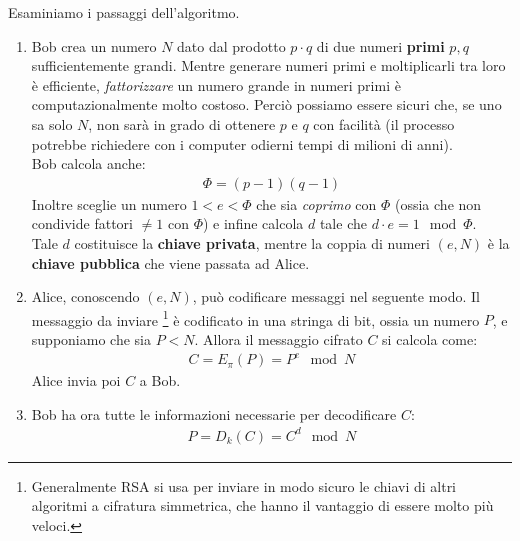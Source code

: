 \documentclass[../../InformazioneQuantistica.tex]{subfiles}
\begin{document}
Esaminiamo i passaggi dell'algoritmo.
\begin{enumerate}
\item Bob crea un numero $N$ dato dal prodotto $p\cdot q$ di due numeri \textbf{primi} $p,q$ sufficientemente grandi. Mentre generare numeri primi e moltiplicarli tra loro è efficiente, \textit{fattorizzare} un numero grande in numeri primi è computazionalmente molto costoso. Perciò possiamo essere sicuri che, se uno sa solo $N$, non sarà in grado di ottenere $p$ e $q$ con facilità (il processo potrebbe richiedere con i computer odierni tempi di milioni di anni).\\
Bob calcola anche:
\begin{align*}
\Phi = (p-1)(q-1)
\end{align*}
Inoltre sceglie un numero $1<e<\Phi$ che sia \textit{coprimo} con $\Phi$ (ossia che non condivide fattori $\neq 1$ con $\Phi$) e infine calcola $d$ tale che $d\cdot e = 1 \mod \Phi$.\\
Tale $d$ costituisce la \textbf{chiave privata}, mentre la coppia di numeri $(e,N)$ è la \textbf{chiave pubblica} che viene passata ad Alice.
\item Alice, conoscendo $(e,N)$, può codificare messaggi nel seguente modo. Il messaggio da inviare \footnote{Generalmente RSA si usa per inviare in modo sicuro le chiavi di altri algoritmi a cifratura simmetrica, che hanno il vantaggio di essere molto più veloci.} è codificato in una stringa di bit, ossia un numero $P$, e supponiamo che sia $P< N$. Allora il messaggio cifrato $C$ si calcola come:
\begin{align}
C = E_\pi (P) = P^e \mod N \label{eqn:crittoRSA}
\end{align}
Alice invia poi $C$ a Bob.
\item Bob ha ora tutte le informazioni necessarie per decodificare $C$:
\begin{align}
P = D_k(C) = C^d \mod N
\label{eqn:decritt}
\end{align}
\end{enumerate}
\end{document}
